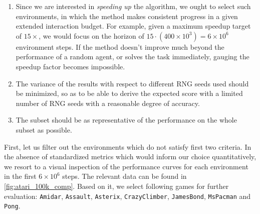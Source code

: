 \documentclass[en]{pracamgr}
\newcommand{\env}[1]{{\tt #1}}
\begin{document}
\begin{enumerate}
  \item Since we are interested in \emph{speeding up} the algorithm, we ought to select such environments, in which the method makes consistent progress in a given extended interaction budget. For example, given a maximum speedup target of $15 \times$, we would focus on the horizon of $15 \cdot (400 \times 10^3) = 6 \times 10^6$ environment steps. If the method doesn't improve much beyond the performance of a random agent, or solves the task immediately, gauging the speedup factor becomes impossible.
  \item The variance of the results with respect to different RNG seeds used should be minimized, so as to be able to derive the expected score with a limited number of RNG seeds with a reasonable degree of accuracy.
  \item The subset should be as representative of the performance on the whole subset as possible.
\end{enumerate}

First, let us filter out the environments which do not satisfy first two criteria. In the absence of standardized metrics which would inform our choice quantitatively, we resort to a visual inspection of the performance curves for each environment in the first $6 \times 10^6$ steps. The relevant data can be found in \autoref{fig:atari_100k_comp}. Based on it, we select following games for further evaluation: \env{Amidar}, \env{Assault}, \env{Asterix}, \env{CrazyClimber}, \env{JamesBond}, \env{MsPacman} and \env{Pong}.
\end{document}
